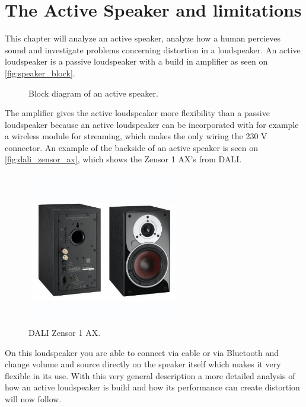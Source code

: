 


\chapter{The Active Speaker and limitations}
This chapter will analyze an active speaker, analyze how a human percieves sound and investigate problems concerning distortion in a loudspeaker. An active loudspeaker is a passive loudspeaker with a build in amplifier as seen on \autoref{fig:speaker_block}. \\
\begin{figure}[H]
\centering
{}
\scalebox{0.9}{
}
\caption{Block diagram of an active speaker.}
\label{fig:speaker_block}
\end{figure}
The amplifier gives the active loudspeaker more flexibility than a passive loudspeaker because an active loudspeaker can be incorporated with for example a wireless module for streaming, which makes the only wiring the 230 V connector. An example of the backside of an active speaker is seen on \autoref{fig:dali_zensor_ax}, which shows the Zensor 1 AX's from DALI.
\begin{figure}[H]
\centering
\includegraphics[width=0.6\textwidth]{figures/dali_zensor_1_ax.jpg}
\caption{DALI Zensor 1 AX.}
\label{fig:dali_zensor_ax}
\end{figure}
On this loudspeaker you are able to connect via cable or via Bluetooth and change volume and source directly on the speaker itself which makes it very flexible in its use. With this very general description a more detailed analysis of how an active loudspeaker is build and how its performance can create distortion will now follow. 

